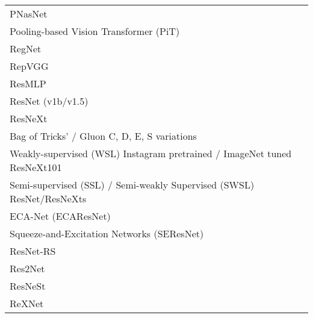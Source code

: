     \begin{table}[]
    \begin{tabular}{ll}
    PNasNet                                                                  & \cite{liu_progressive_2018}              \\
    Pooling-based Vision Transformer (PiT)                                   & \cite{heo_rethinking_2021}               \\
    RegNet                                                                   & \cite{radosavovic_designing_2020}        \\
    RepVGG                                                                   & \cite{ding_repvgg_2021}                  \\
    ResMLP                                                                   & \cite{touvron_resmlp_2021}               \\
    ResNet (v1b/v1.5)                                                        & \cite{he_deep_2015}                      \\
    ResNeXt                                                                  & \cite{xie_aggregated_2017}               \\
    Bag of Tricks' / Gluon C, D, E, S variations                             & \cite{he_bag_2018}                       \\
    Weakly-supervised (WSL) Instagram pretrained / ImageNet tuned ResNeXt101 & \cite{mahajan_exploring_2018}            \\
    Semi-supervised (SSL) / Semi-weakly Supervised (SWSL) ResNet/ResNeXts    & \cite{yalniz_billion-scale_2019}         \\
    ECA-Net (ECAResNet)                                                      & \cite{DBLP:journals/corr/abs-1910-03151} \\
    Squeeze-and-Excitation Networks (SEResNet)                               & \cite{hu_squeeze-and-excitation_2019}    \\
    ResNet-RS                                                                & \cite{bello_revisiting_2021}             \\
    Res2Net                                                                  & \cite{gao_res2net_2021}                  \\
    ResNeSt                                                                  & \cite{zhang_resnest_2020}                \\
    ReXNet                                                                   & \cite{han_rethinking_2021}               \\

\end{tabular}
\end{table}
